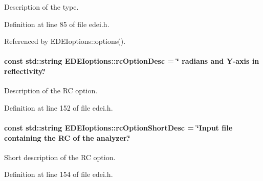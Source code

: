 Description of the type. 



Definition at line 85 of file edei.h.



Referenced by EDEIoptions::options().

\hypertarget{group__edeiedei_ga4ca0ca5e3acea8517ed7806eca3b9f71}{
\paragraph[{rcOptionDesc}]{\setlength{\rightskip}{0pt plus 5cm}const std::string {\bf EDEIoptions::rcOptionDesc} = \char`\"{} radians and Y-\/axis in reflectivity.\char`\"{}}\hfill}
\label{group__edeiedei_ga4ca0ca5e3acea8517ed7806eca3b9f71}


Description of the RC option. 



Definition at line 152 of file edei.h.

\hypertarget{group__edeiedei_gaf8b9f6e9837dd2d85f8c01071a69b06e}{
\paragraph[{rcOptionShortDesc}]{\setlength{\rightskip}{0pt plus 5cm}const std::string {\bf EDEIoptions::rcOptionShortDesc} = \char`\"{}Input file containing the RC of the analyzer.\char`\"{}}\hfill}
\label{group__edeiedei_gaf8b9f6e9837dd2d85f8c01071a69b06e}


Short description of the RC option. 



Definition at line 154 of file edei.h.

